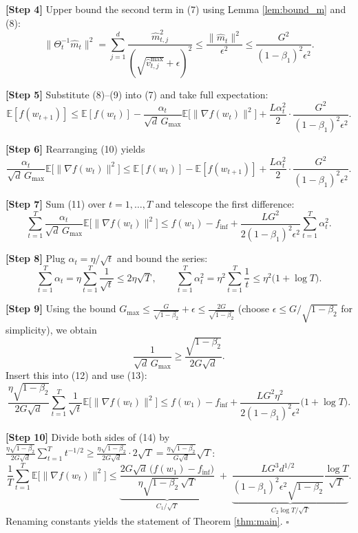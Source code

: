 \documentclass{article}
\begin{document}
\noindent\textbf{[Step 4]} Upper bound the second term in (7) using Lemma \ref{lem:bound_m} and (8):
\[
\|\Theta_t^{-1}\widehat m_t\|^{2}
= \sum_{j=1}^{d}\frac{\widehat m_{t,j}^{2}}{(\sqrt{\widehat v_{t,j}^{\text{max}}}+\epsilon)^{2}}
\le \frac{\|\widehat m_t\|^{2}}{\epsilon^{2}}
\le \frac{G^{2}}{(1-\beta_1)^{2}\epsilon^{2}}. \tag{9}
\]

\noindent\textbf{[Step 5]} Substitute (8)–(9) into (7) and take full expectation:
\[
\mathbb{E}[f(w_{t+1})]
\le \mathbb{E}[f(w_t)]
-\frac{\alpha_t}{\sqrt{d}\,G_{\max}}\mathbb{E}\big[\|\nabla f(w_t)\|^{2}\big]
+\frac{L\alpha_t^{2}}{2}\cdot\frac{G^{2}}{(1-\beta_1)^{2}\epsilon^{2}}. \tag{10}
\]

\noindent\textbf{[Step 6]} Rearranging (10) yields
\[
\frac{\alpha_t}{\sqrt{d}\,G_{\max}}\mathbb{E}\big[\|\nabla f(w_t)\|^{2}\big]
\le \mathbb{E}[f(w_t)]-\mathbb{E}[f(w_{t+1})]
+\frac{L\alpha_t^{2}}{2}\cdot\frac{G^{2}}{(1-\beta_1)^{2}\epsilon^{2}}. \tag{11}
\]

\noindent\textbf{[Step 7]} Sum (11) over $t=1,\dots,T$ and telescope the first difference:
\[
\sum_{t=1}^{T}\frac{\alpha_t}{\sqrt{d}\,G_{\max}}
\mathbb{E}\big[\|\nabla f(w_t)\|^{2}\big]
\le f(w_1)-f_{\inf}
+\frac{L G^{2}}{2(1-\beta_1)^{2}\epsilon^{2}}\sum_{t=1}^{T}\alpha_t^{2}. \tag{12}
\]

\noindent\textbf{[Step 8]} Plug $\alpha_t=\eta/\sqrt{t}$ and bound the series:
\[
\sum_{t=1}^{T}\alpha_t = \eta\sum_{t=1}^{T}\frac{1}{\sqrt{t}}\le 2\eta\sqrt{T},
\qquad
\sum_{t=1}^{T}\alpha_t^{2}= \eta^{2}\sum_{t=1}^{T}\frac{1}{t}\le \eta^{2}\big(1+\log T\big). \tag{13}
\]

\noindent\textbf{[Step 9]} Using the bound $G_{\max}\le \frac{G}{\sqrt{1-\beta_2}}+\epsilon\le \frac{2G}{\sqrt{1-\beta_2}}$ (choose $\epsilon\le G/\sqrt{1-\beta_2}$ for simplicity), we obtain
\[
\frac{1}{\sqrt{d}\,G_{\max}}\ge \frac{\sqrt{1-\beta_2}}{2G\sqrt{d}}.
\]
Insert this into (12) and use (13):
\[
\frac{\eta\sqrt{1-\beta_2}}{2G\sqrt{d}}\sum_{t=1}^{T}\frac{1}{\sqrt{t}}
\mathbb{E}\big[\|\nabla f(w_t)\|^{2}\big]
\le f(w_1)-f_{\inf}
+\frac{L G^{2}\eta^{2}}{2(1-\beta_1)^{2}\epsilon^{2}}\big(1+\log T\big). \tag{14}
\]

\noindent\textbf{[Step 10]} Divide both sides of (14) by $\displaystyle\frac{\eta\sqrt{1-\beta_2}}{2G\sqrt{d}}\sum_{t=1}^{T}t^{-1/2}\ge\frac{\eta\sqrt{1-\beta_2}}{2G\sqrt{d}}\cdot 2\sqrt{T}= \frac{\eta\sqrt{1-\beta_2}}{G\sqrt{d}}\sqrt{T}$:
\[
\frac{1}{T}\sum_{t=1}^{T}\mathbb{E}\big[\|\nabla f(w_t)\|^{2}\big]
\le
\underbrace{\frac{2G\sqrt{d}\,\big(f(w_1)-f_{\inf}\big)}{\eta\sqrt{1-\beta_2}\,\sqrt{T}}}_{C_1/\sqrt{T}}
\;+\;
\underbrace{\frac{L G^{3}d^{1/2}}{(1-\beta_1)^{2}\epsilon^{2}\sqrt{1-\beta_2}}
\frac{\log T}{\sqrt{T}}}_{C_2\log T/\sqrt{T}}.
\]
Renaming constants yields the statement of Theorem \ref{thm:main}.  $\square$
\end{document}
